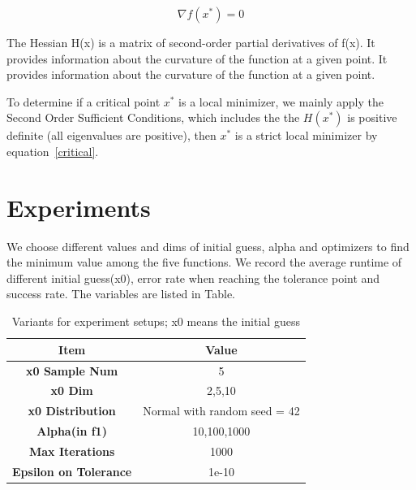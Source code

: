 \documentclass[12pt]{article}
\begin{document}
\begin{equation}
\nabla f(x^*) = 0
\label{critical}
\end{equation}

The Hessian H(x) is a matrix of second-order partial derivatives of f(x). It provides information about the curvature of the function at a given point. It provides information about the curvature of the function at a given point.

To determine if a critical point $x^*$ is a local minimizer, we mainly apply the Second Order Sufficient Conditions, which includes the the $H(x^*)$ is positive definite (all eigenvalues are positive), then $x^*$ is a strict local minimizer by equation~\ref{critical}.






\section{Experiments}


We choose different values and dims of initial guess, alpha and optimizers to find the minimum value among the five functions. We record the average runtime of different initial guess(x0), error rate when reaching the tolerance point and success rate. The variables are listed in Table. %

\begin{table}[h!]
\label{table:rule}
\centering
\begin{tabular}{cc}
\toprule
 \textbf{Item} & \textbf{Value} \\ 
\midrule
\textbf{x0 Sample Num} & 5 \\
\textbf{x0 Dim} & {2,5,10} \\
\textbf{x0 Distribution} & Normal with random seed = 42 \\
\textbf{Alpha(in f1)} & {10,100,1000} \\
\textbf{Max Iterations} & 1000 \\
\textbf{Epsilon on Tolerance} & 1e-10 \\
\bottomrule
\end{tabular}
\caption{Variants for experiment setups; x0 means the initial guess}
\end{table}
\end{document}
